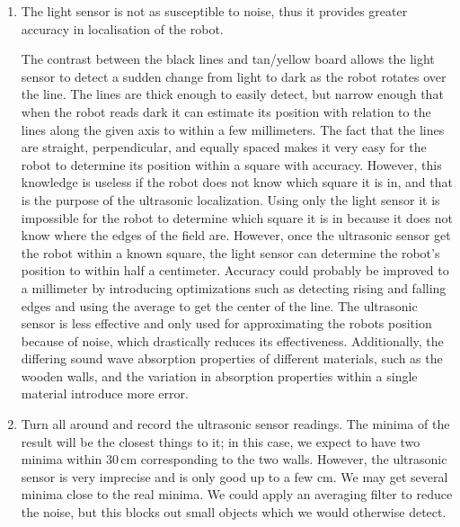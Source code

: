 \documentclass[twocolumn]{article}
\begin{document}
\begin{enumerate}
\item
The light sensor is not as susceptible to noise, thus it provides greater accuracy in localisation of the robot.

The contrast between the black lines and tan/yellow board allows the light sensor to detect a sudden change from light to dark as the robot rotates over the line. The lines are thick enough to easily detect, but narrow enough that when the robot reads dark it can estimate its position with relation to the lines along the given axis to within a few millimeters. The fact that the lines are straight, perpendicular, and equally spaced makes it very easy for the robot to determine its position within a square with accuracy. However, this knowledge is useless if the robot does not know which square it is in, and that is the purpose of the ultrasonic localization. Using only the light sensor it is impossible for the robot to determine which square it is in because it does not know where the edges of the field are. However, once the ultrasonic sensor get the robot within a known square, the light sensor can determine the robot’s position to within half a centimeter. Accuracy could probably be improved to a millimeter by introducing optimizations such as detecting rising and falling edges and using the average to get the center of the line. The ultrasonic sensor is less effective and only used for approximating the robots position because of noise, which drastically reduces its effectiveness. Additionally, the differing sound wave absorption properties of different materials, such as the wooden walls, and the variation in absorption properties within a single material introduce more error.

\item

Turn all around and record the ultrasonic sensor readings.
The minima of the result will be the closest things to it;
in this case, we expect to have two minima within 30\,cm corresponding
to the two walls. However, the ultrasonic sensor is very
imprecise and is only good up to a few cm. We may get several minima close to the real minima.
We could apply an averaging filter to reduce the noise, but this blocks out small objects which we would otherwise detect.


\end{enumerate}
\end{document}

